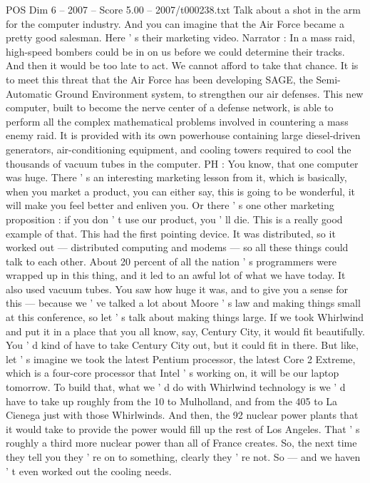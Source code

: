 \begin{textsample}{POS Dim 6 – 2007 – Score 5.00 – 2007/t000238.txt}
Talk about a shot in the arm for the computer industry.
And you can imagine that the Air Force became a pretty good salesman.
Here ' s their marketing video.
Narrator : In a mass raid, high-speed bombers could be in on us before we could determine their tracks.
And then it would be too late to act.
We cannot afford to take that chance.
It is to meet this threat that the Air Force has been developing SAGE, the Semi-Automatic Ground Environment system, to strengthen our air defenses.
This new computer, built to become the nerve center of a defense network, is able to perform all the complex mathematical problems involved in countering a mass enemy raid.
It is provided with its own powerhouse containing large diesel-driven generators, air-conditioning equipment, and cooling towers required to cool the thousands of vacuum tubes in the computer.
PH : You know, that one computer was huge.
There ' s an interesting marketing lesson from it, which is basically, when you market a product, you can either say, this is going to be wonderful, it will make you feel better and enliven you.
Or there ' s one other marketing proposition : if you don ' t use our product, you ' ll die.
This is a really good example of that.
This had the first pointing device.
It was distributed, so it worked out — distributed computing and modems — so all these things could talk to each other.
About 20 percent of all the nation ' s programmers were wrapped up in this thing, and it led to an awful lot of what we have today.
It also used vacuum tubes.
You saw how huge it was, and to give you a sense for this — because we ' ve talked a lot about Moore ' s law and making things small at this conference, so let ' s talk about making things large.
If we took Whirlwind and put it in a place that you all know, say, Century City, it would fit beautifully.
You ' d kind of have to take Century City out, but it could fit in there.
But like, let ' s imagine we took the latest Pentium processor, the latest Core 2 Extreme, which is a four-core processor that Intel ' s working on, it will be our laptop tomorrow.
To build that, what we ' d do with Whirlwind technology is we ' d have to take up roughly from the 10 to Mulholland, and from the 405 to La Cienega just with those Whirlwinds.
And then, the 92 nuclear power plants that it would take to provide the power would fill up the rest of Los Angeles.
That ' s roughly a third more nuclear power than all of France creates.
So, the next time they tell you they ' re on to something, clearly they ' re not.
So — and we haven ' t even worked out the cooling needs.

\end{textsample}
